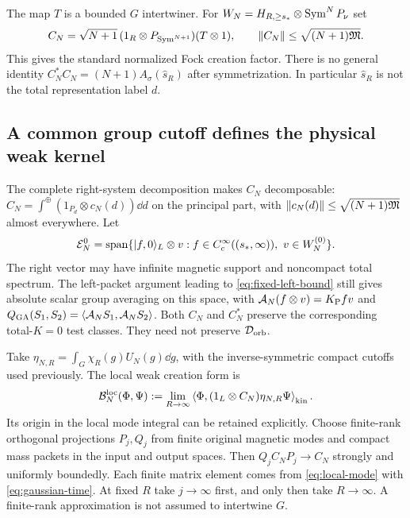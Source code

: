The map $T$ is a bounded $G$ intertwiner. For
$W_N=H_{R,\ge s_*}\otimes\operatorname{Sym}^NP_\nu$ set
\begin{equation}
 C_N=\sqrt{N+1}\,(1_R\otimes P_{\operatorname{Sym}^{N+1}})(T\otimes1),
 \qquad \left\lVert C_N\right\rVert\le\sqrt{(N+1)\mathfrak M}.
 \label{eq:bose-block}
\end{equation}
This gives the standard normalized Fock creation factor. There is no
general identity $C_N^*C_N=(N+1)A_\sigma(\hat s_R)$ after symmetrization.
In particular $\hat s_R$ is not the total representation label $d$.

\subsection{A common group cutoff defines the physical weak kernel}
The complete right-system decomposition makes $C_N$ decomposable:
$C_N=\int^\oplus(1_{P_d}\otimes c_N(d))\dd d$ on the principal part,
with $\left\lVert c_N(d)\right\rVert\le\sqrt{(N+1)\mathfrak M}$ almost everywhere.
Let
\begin{equation}
 \mathcal E_N^0=\operatorname{span}\{|f,0\rangle_L\otimes v:
           f\in C_c^\infty((s_*,\infty)),\ v\in W_N^{(0)}\}.
\end{equation}
The right vector may have infinite magnetic support and noncompact total
spectrum. The left-packet argument leading to \eqref{eq:fixed-left-bound}
still gives absolute scalar group averaging on this space, with
$\mathcal A_N(f\otimes v)=K_{\mathrm P} f v$ and
$Q_{\mathrm{GA}}(S_1,S_2)=\left\langle\mathcal A_NS_1,\mathcal A_NS_2\right\rangle$.
Both $C_N$ and $C_N^*$ preserve the corresponding total-$K=0$ test classes.
They need not preserve $\mathcal D_{\mathrm{orb}}$.

Take $\eta_{N,R}=\int_G\chi_R(g)U_N(g)\dd g$, with the inverse-symmetric
compact cutoffs used previously. The local weak creation form is
\begin{equation}
 \mathcal B_N^{\mathrm{loc}}(\Phi,\Psi)
 :=\lim_{R\to\infty}
 \left\langle\Phi,(1_L\otimes C_N)\eta_{N,R}\Psi\right\rangle_{\mathrm{kin}}.
 \label{eq:weak-local-definition}
\end{equation}
Its origin in the local mode integral can be retained explicitly. Choose
finite-rank orthogonal projections $P_j,Q_j$ from finite original magnetic
modes and compact mass packets in the input and output spaces. Then
$Q_jC_NP_j\to C_N$ strongly and uniformly boundedly. Each finite matrix
element comes from \eqref{eq:local-mode} with
\eqref{eq:gaussian-time}. At fixed $R$ take $j\to\infty$ first, and only
then take $R\to\infty$. A finite-rank approximation is not assumed to
intertwine $G$.

